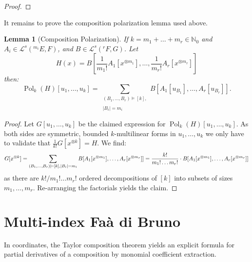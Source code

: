 \documentclass[10pt,a4paper]{article}
\theoremstyle{plain}
\newtheorem{lemma}[theorem]{Lemma}
\theoremstyle{definition}
\newcommand{\IN}{\mathbb{N}} %
\newcommand{\1}{\mathbb{1}} %
\newcommand{\tensor}{\otimes} %
\newcommand{\KL}{\mathcal{L}}
\newcommand{\ssum}[1]{\sum_{\substack{#1}}} %
\newcommand{\opart}{\models} %
\DeclareMathOperator{\Pol}{Pol} %
\begin{document}
\begin{proof}
\end{proof}

It remains to prove the composition polarization lemma used above.

\begin{lemma}[Composition Polarization]

\label{lem:pol-comp} If \(k = m_1 + \dots + m_r \in \IN_0\) and
\(A_i \in \KL^s(^{m_i} E,F)\), and \(B \in \KL^s(^r F,G)\). Let \[
H(x) = B[\frac{1}{m_1!}A_1[x^{\tensor m_1}], \dots, \frac{1}{m_r!}A_r[x^{\tensor m_r}]]
\] then: \[
\Pol_k(H)[u_1,\dots,u_k] = \ssum{(B_1,\dots,B_r) \opart [k], \\\\ |B_i| = m_i} B[A_1[u_{B_1}], \dots, A_r[u_{B_r}]].
\]

\end{lemma}

\begin{proof}

Let \(G[u_1,\dots,u_k]\) be the claimed expression for
\(\Pol_k(H)[u_1,\dots,u_k]\). As both sides are symmetric, bounded
\(k\)-multilinear forms in \(u_1,\dots,u_k\) we only have to validate
that \(\frac{1}{k!} G[x^{\tensor k}] = H\). We find: \[
G[x^{\tensor k}] 
= \sum_{(B_1,\dots,B_r) \opart [k], \\\\ |B_i| = m_i} B[A_1[x^{\tensor m_1}], \dots, A_r[x^{\tensor m_r}]] 
= \frac{k!}{m_1! \dots m_r!} \cdot B[A_1[x^{\tensor m_1}], \dots, A_r[x^{\tensor m_r}]]
\] as there are \(k! / m_1! \dots m_r!\) ordered decompositions of
\([k]\) into subsets of sizes \(m_1,\dots,m_r\). Re-arranging the
factorials yields the claim.

\end{proof}

\section{Multi-index Faà di Bruno}\label{multi-index-fauxe0-di-bruno}

In coordinates, the Taylor composition theorem yields an explicit
formula for partial derivatives of a composition by monomial coefficient
extraction.
\end{document}

